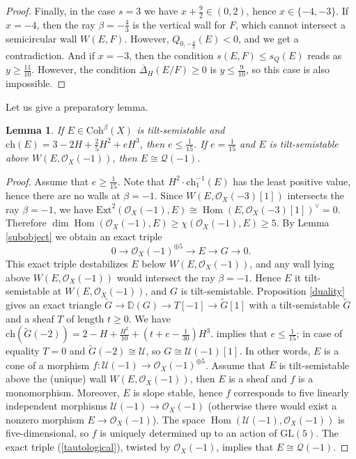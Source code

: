 \documentclass{amsart}
\DeclareMathOperator{\Hom}{Hom}
\newtheorem{lemma}[theorem]{Lemma}
\begin{document}
\begin{proof}
		Finally, in the case $s=3$ we have $x+\frac 92\in(0,2)$, hence $x\in\{-4,-3\}$. If $x=-4$, then the ray $\beta=-\frac 43$ is the vertical wall for $F$, which cannot intersect a semicircular wall $W(E,F)$. However, $Q_{0,-\frac 43}(E)<0$, and we get a contradiction. And if $x=-3$, then the condition $s(E,F)\le s_Q(E)$ reads as $y\ge\frac{11}{10}$. However, the condition $\overline{\Delta}_H(E/F)\ge 0$ is $y\le\frac{9}{10}$, so this case is also impossible.
	\end{proof}
	
	Let us give a preparatory lemma.
	
	\begin{lemma}\label{3 -2 2/5} If $E\in\mathrm{Coh}^\beta(X)$ is tilt-semistable and $\mathrm{ch}(E)=3-2H+\frac 25H^2+eH^3$, then $e\le \frac{1}{15}$. If $e=\frac{1}{15}$ and $E$ is tilt-semistable above $W(E,\mathcal O_X(-1))$, then $E\cong\mathcal Q(-1)$.
	\end{lemma}
	
	\begin{proof} Assume that $e\ge\frac{1}{15}$. Note that $H^2\cdot\mathrm{ch}_1^{-1}(E)$ has the least positive value, hence there are no walls at $\beta=-1$. Since $W(E,\mathcal O_X(-3)[1])$ intersects the ray $\beta=-1$, we have $\mathrm{Ext}^2(\mathcal O_X(-1),E)\cong\Hom(E,\mathcal O_X(-3)[1])^\vee=0$. Therefore $\dim \Hom(\mathcal O_X(-1),E)\ge\chi(\mathcal O_X(-1),E)\ge 5$. By Lemma \ref{subobject} we obtain an exact triple
		\begin{equation}\label{triple17}0\to\mathcal O_X(-1)^{\oplus 5}\to E\to G\to 0.
		\end{equation}
		This exact triple destabilizes $E$ below $W(E,\mathcal O_X(-1))$, and any wall lying above $W(E,\mathcal O_X(-1))$ would intersect the ray $\beta=-1$. Hence $E$ it tilt-semistable at $W(E,\mathcal O_X(-1))$, and $G$ is tilt-semistable. Proposition \ref{duality} gives an exact triangle $\widetilde{G}\to\mathbb D(G)\to T[-1]\to\widetilde{G}[1]$ with a tilt-semistable $\widetilde{G}$ and a sheaf $T$ of length $t\ge 0$. We have $\mathrm{ch}(\widetilde{G}(-2))=2-H+\frac{H^2}{10}+(t+e-\frac{1}{30})H^3$. \cite[Lemma 3.6]{Vass} implies that $e\le\frac{1}{15}$; in case of equality $T=0$ and $\widetilde{G}(-2)\cong\mathcal U$, so $G\cong\mathcal U(-1)[1]$. In other words, $E$ is a cone of a morphism $f:\mathcal U(-1)\to\mathcal O_X(-1)^{\oplus 5}$. Assume that $E$ is tilt-semistable above the (unique) wall $W(E,\mathcal O_X(-1))$, then $E$ is a sheaf and $f$ is a monomorphism. Moreover, $E$ is slope stable, hence $f$ corresponds to five linearly independent morphisms $\mathcal U(-1)\to\mathcal O_X(-1)$ (otherwise there would exist a nonzero morphism $E\to\mathcal O_X(-1)$). The space $\Hom(\mathcal U(-1),\mathcal O_X(-1))$ is five-dimensional, so $f$ is uniquely determined up to an action of $\mathrm{GL}(5)$. The exact triple (\ref{tautological}), twisted by $\mathcal O_X(-1)$, implies that $E\cong\mathcal Q(-1)$.
	\end{proof}
	
\end{document}
